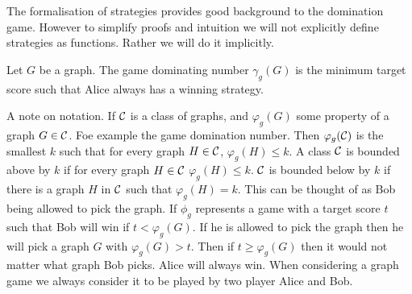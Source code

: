 The formalisation of strategies provides good background to the domination game. However to simplify proofs and intuition we will not explicitly define strategies as functions. Rather we will do it implicitly.    

\begin{definition}
    Let $G$ be a graph. The game dominating number $\gamma_g(G)$ is the minimum target score such that Alice always has a winning strategy.
\end{definition} 

A note on notation. If $\mathcal{C}$ is a class of graphs, and $\varphi_g(G)$ some property of a graph $G \in \mathcal{C}$. Foe example the game domination number. Then $\varphi_g(\mathcal{C})$ is the smallest $k$ such that for every graph $H\in\mathcal{C}$, $\varphi_g(H)\leq k$. A class $\mathcal{C}$ is bounded above by $k$ if for every graph $H\in\mathcal{C}$ $\varphi_g(H)\leq k$. $\mathcal{C}$ is bounded below by $k$ if there is a graph $H$ in $\mathcal{C}$ such that $\varphi_g(H)= k$. This can be thought of as Bob being allowed to pick the graph. If $\phi_g$ represents a game with a target score $t$ such that Bob will win if $t < \varphi_g(G)$. If he is allowed to pick the graph then he will pick a graph $G$ with $\varphi_g(G) > t$. Then if $t\geq \varphi_g(G)$ then it would not matter what graph Bob picks. Alice will always win. When considering a graph game we always consider it to be played by two player Alice and Bob.  

%        
%
%    
%
%
%
%
%    

